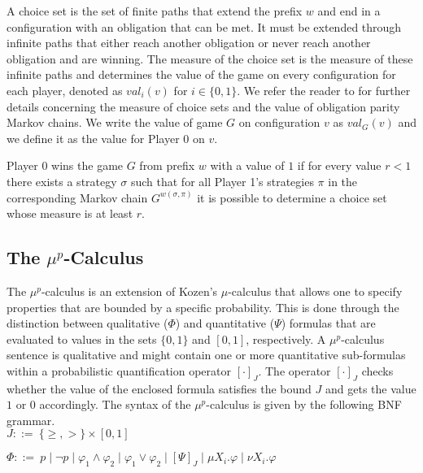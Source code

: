 \documentclass[a4paper,UKenglish]{oasics-v2016}
\begin{document}
A choice set is the set of finite paths that extend the prefix $w$ and end in 
a configuration with an obligation that can be met.
It must be extended through infinite paths that either reach another obligation 
or never reach another obligation and are winning.
The measure of the choice set is the measure of these infinite paths and 
determines the value of the game on every configuration for each player, 
denoted as $val_i(v)$ for $i\in\lbrace 0,1\rbrace$.
We refer the reader to \cite{CP13} for further details concerning the measure 
of choice sets and the value of obligation parity Markov chains.
We write the value of game $G$ on configuration $v$ as $val_G(v)$ and we define 
it as the value for Player 0 on $v$. 

Player 0 wins the game $G$ from prefix $w$ with a value of $1$ if for
every value $r<1$ there exists a strategy $\sigma$ such
that for all Player 1's strategies $\pi$ in the corresponding Markov
chain $G^{w(\sigma, \pi)}$ it is possible to determine a choice set
whose measure is at least $r$.  
%
%
\subsection{The $\mu^p$-Calculus}
The $\mu^{p}$-calculus \cite{CKP15} is an extension of Kozen's 
$\mu$-calculus \cite{Koz83} that allows one to specify properties that are 
bounded by a specific probability.
This is done through the distinction between qualitative ($\Phi$) and 
quantitative ($\Psi$) formulas that are evaluated to values in the sets 
$\lbrace 0,1 \rbrace$ and $[0,1]$, respectively.
A $\mu^p$-calculus sentence is qualitative and might contain one or more 
quantitative sub-formulas within a probabilistic quantification operator 
$[\cdot]_J$.
The operator $[\cdot]_J$ checks whether the value of the enclosed formula 
satisfies the bound $J$ and gets the value $1$ or $0$ accordingly.
The syntax of the $\mu^p$-calculus is given by the following BNF 
grammar.\vspace*{5pt}\\
\hspace*{15pt}$J ::=\ \lbrace \geq, > \rbrace \times [0,1]$

$\Phi ::=\ p \mid \neg p \mid \varphi_1 \wedge \varphi_2 \mid \varphi_1 \vee 
\varphi_2 \mid [\Psi]_J \mid \mu X_i.\varphi \mid \nu X_i.\varphi $
\end{document}
